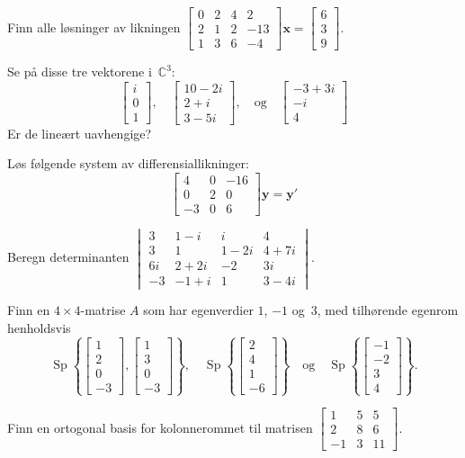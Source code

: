 \documentclass[titlepage,a4paper,12pt,norsk]{IMFeksamen}
\newcommand{\C}{\mathbb{C}}
\DeclareMathOperator{\Sp}{Sp}
\newcommand{\V}[1]{\mathbf{#1}}
\newcommand{\vvv}[3]{\begin{bmatrix} #1 \\ #2 \\ #3 \end{bmatrix}}
\newcommand{\vvvv}[4]{\begin{bmatrix} #1 \\ #2 \\ #3 \\ #4 \end{bmatrix}}
\newcommand{\x}{\V{x}}
\newcommand{\0}{\V{0}}
\begin{document}
\begin{oppgave}
Finn alle løsninger av likningen
$
\begin{bmatrix}
0 & 2 & 4 &   2 \\
2 & 1 & 2 & -13 \\
1 & 3 & 6 &  -4
\end{bmatrix}
\x
= \vvv{6}{3}{9}
$.
\end{oppgave}


\begin{oppgave}
Se på disse tre vektorene i~$\C^3$:
\[
\vvv{i}{0}{1},\quad
\vvv{10-2i}{2+i}{3-5i},\quad\text{og}\quad
\vvv{-3+3i}{-i}{4}
\]
Er de lineært uavhengige?
\end{oppgave}


\begin{oppgave}
Løs følgende system av differensiallikninger:
\[
\begin{bmatrix}
4 & 0 & -16 \\
  0 & 2 & 0 \\
-3 & 0 & 6
\end{bmatrix}
\V{y}
= \V{y}'
\]
\end{oppgave}


\begin{oppgave}
Beregn determinanten
$
\begin{vmatrix}
 3 &  1 - i  & i      & 4      \\
 3 &  1      & 1 - 2i & 4 + 7i \\
6i &  2 + 2i & -2     & 3i     \\
-3 & -1 + i  & 1      & 3 - 4i
\end{vmatrix}
$.
\end{oppgave}


\begin{oppgave}
Finn en $4 \times 4$-matrise $A$ som har egenverdier $1$, $-1$ og~$3$,
med tilhørende egenrom henholdsvis
\[
\Sp \left\{ \vvvv{1}{2}{0}{-3}, \vvvv{1}{3}{0}{-3} \right\},\quad
\Sp \left\{ \vvvv{2}{4}{1}{-6} \right\}
\quad\text{og}\quad
\Sp \left\{ \vvvv{-1}{-2}{3}{4} \right\}.
\]
\end{oppgave}


\begin{oppgave}
Finn en ortogonal basis for kolonnerommet til matrisen
$
\begin{bmatrix}
1 & 5 & 5 \\
2 & 8 & 6 \\
-1 & 3 & 11
\end{bmatrix}
$.
\end{oppgave}
\end{document}
